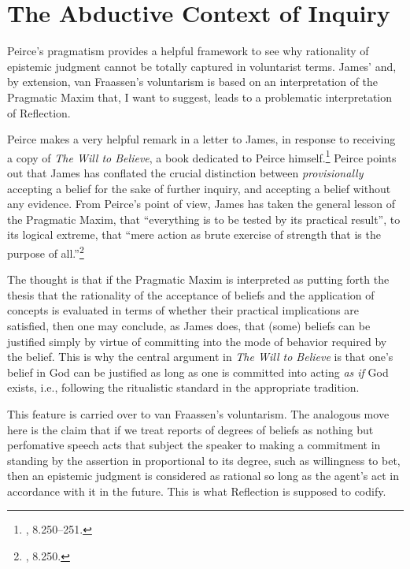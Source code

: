 \hypertarget{the-abductive-context-of-inquiry}{%
\section{The Abductive Context of
Inquiry}\label{sec:the-abductive-context-of-inquiry}}

Peirce's pragmatism provides a helpful framework to see why rationality
of epistemic judgment cannot be totally captured in voluntarist terms.
James' and, by extension, van Fraassen's voluntarism is based on an
interpretation of the Pragmatic Maxim that, I want to suggest, leads to
a problematic interpretation of Reflection.

Peirce makes a very helpful remark in a letter to James, in response to
receiving a copy of \emph{The Will to Believe}, a book dedicated to
Peirce himself.\footnote{\cite{CP}, 8.250--251.} Peirce points out that James has
conflated the crucial distinction between \emph{provisionally} accepting
a belief for the sake of further inquiry, and accepting a belief without
any evidence. From Peirce's point of view, James has taken the general
lesson of the Pragmatic Maxim, that ``everything is to be tested by its
practical result'', to its logical extreme, that ``mere action as brute
exercise of strength that is the purpose of all.''\footnote{\cite{CP},
  8.250.}

The thought is that if the Pragmatic Maxim is interpreted as putting forth the thesis that the rationality of the acceptance of beliefs and the application of
concepts is evaluated in terms of whether their practical implications
are satisfied, then one may conclude, as James does, that (some) beliefs
can be justified simply by virtue of committing into the mode of
behavior required by the belief. This is why the central argument in
\emph{The Will to Believe} is that one's belief in God can be justified
as long as one is committed into acting \emph{as if} God exists, i.e., following the ritualistic standard in the appropriate tradition.

This feature is carried over to van Fraassen's voluntarism. The
analogous move here is the claim that if we treat reports of degrees of
beliefs as nothing but perfomative speech acts that subject the speaker
to making a commitment in standing by the assertion in proportional to
its degree, such as willingness to bet, then an epistemic judgment is
considered as rational so long as the agent's act in accordance with it in
the future. This is what Reflection is supposed to codify.

